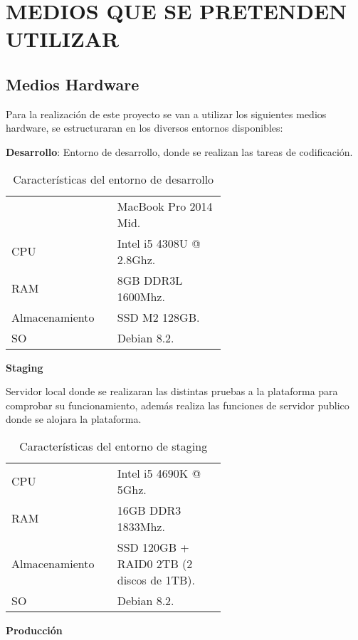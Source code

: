 \documentclass{pre-tfg}
\begin{document}
\clearpage
\section{MEDIOS QUE SE PRETENDEN UTILIZAR}

\subsection{Medios Hardware}

Para la realización de este proyecto se van a utilizar los siguientes medios hardware, se
estructuraran en los diversos entornos disponibles:

\textbf{Desarrollo}:
Entorno de desarrollo, donde se realizan las tareas de codificación.

\begin{table}[hp]
  \caption{Características del entorno de desarrollo}
  \centering

  \begin{tabular}{p{0.2\linewidth}p{0.4\linewidth}}
    & MacBook Pro 2014 Mid.\\
    CPU& Intel i5 4308U @ 2.8Ghz.\\
    RAM& 8GB DDR3L 1600Mhz.\\
    Almacenamiento& SSD M2 128GB.\\
    SO& Debian 8.2.\\
  \end{tabular}
\end{table}

\textbf{Staging}

Servidor local donde se realizaran las distintas pruebas a la plataforma para comprobar su
funcionamiento, además realiza las funciones de servidor publico donde se alojara la
plataforma.

\begin{table}[hp]
  \caption{Características del entorno de staging}
  \centering

  \begin{tabular}{p{0.2\linewidth}p{0.4\linewidth}}
    CPU& Intel i5 4690K @ 5Ghz.\\
    RAM& 16GB DDR3 1833Mhz.\\
    Almacenamiento& SSD 120GB + RAID0 2TB (2 discos de 1TB).\\
    SO& Debian 8.2.\\
  \end{tabular}
\end{table}

\textbf{Producción}
\end{document}
